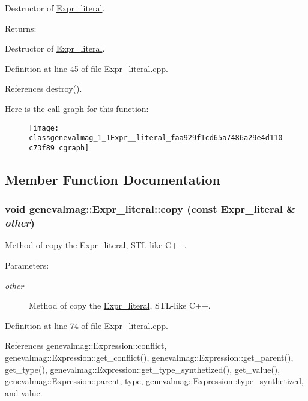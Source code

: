 Destructor of \hyperlink{classgenevalmag_1_1Expr__literal}{Expr\_\-literal}. \begin{Desc}
\item[Returns:]\end{Desc}
Destructor of \hyperlink{classgenevalmag_1_1Expr__literal}{Expr\_\-literal}. 

Definition at line 45 of file Expr\_\-literal.cpp.

References destroy().

Here is the call graph for this function:\nopagebreak
\begin{figure}[H]
\begin{center}
\leavevmode
\texttt{[image: classgenevalmag\_1\_1Expr\_\_literal\_faa929f1cd65a7486a29e4d110c73f89\_cgraph]}
\end{center}
\end{figure}


\subsection{Member Function Documentation}
\hypertarget{classgenevalmag_1_1Expr__literal_ab439489dbf96ebac5c518277a681698}{
\subsubsection[{copy}]{\setlength{\rightskip}{0pt plus 5cm}void genevalmag::Expr\_\-literal::copy (const {\bf Expr\_\-literal} \& {\em other})}}
\label{classgenevalmag_1_1Expr__literal_ab439489dbf96ebac5c518277a681698}


Method of copy the \hyperlink{classgenevalmag_1_1Expr__literal}{Expr\_\-literal}, STL-like C++. \begin{Desc}
\item[Parameters:]
\begin{description}
\item[{\em other}]Method of copy the \hyperlink{classgenevalmag_1_1Expr__literal}{Expr\_\-literal}, STL-like C++. \end{description}
\end{Desc}


Definition at line 74 of file Expr\_\-literal.cpp.

References genevalmag::Expression::conflict, genevalmag::Expression::get\_\-conflict(), genevalmag::Expression::get\_\-parent(), get\_\-type(), genevalmag::Expression::get\_\-type\_\-synthetized(), get\_\-value(), genevalmag::Expression::parent, type, genevalmag::Expression::type\_\-synthetized, and value.

